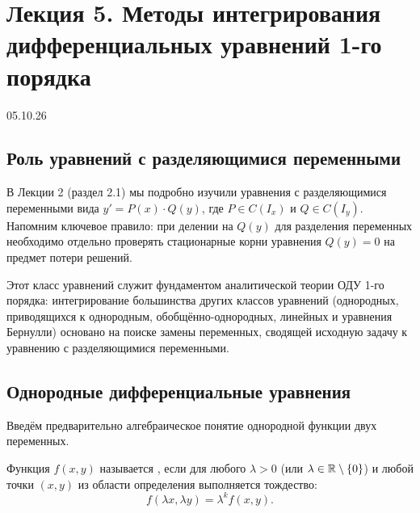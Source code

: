 \section{Лекция 5. Методы интегрирования дифференциальных уравнений 1-го порядка}

\begin{flushright}
    05.10.26
\end{flushright}

\subsection{Роль уравнений с разделяющимися переменными}

В Лекции 2 (раздел 2.1) мы подробно изучили уравнения с разделяющимися
переменными вида $y' = P(x) \cdot Q(y)$, где $P \in C(I_x)$ и $Q \in C(I_y)$.
Напомним ключевое правило: при делении на $Q(y)$ для разделения переменных
необходимо отдельно проверять стационарные корни уравнения $Q(y) = 0$ на
предмет потери решений.

Этот класс уравнений служит фундаментом аналитической теории ОДУ 1-го порядка:
интегрирование большинства других классов уравнений (однородных, приводящихся
к однородным, обобщённо-однородных, линейных и уравнения Бернулли) основано на
поиске замены переменных, сводящей исходную задачу к уравнению с
разделяющимися переменными.

\subsection{Однородные дифференциальные уравнения}

Введём предварительно алгебраическое понятие однородной функции двух
переменных.

\begin{definition}
    Функция $f(x, y)$ называется , если для любого $\lambda > 0$ (или
    $\lambda \in \mathbb{R} \setminus \{0\}$) и любой точки $(x, y)$ из области
    определения выполняется тождество:
    \begin{equation} \label{eq:l5_hom_def}
        f(\lambda x, \lambda y) = \lambda^k f(x, y). \tag{1}
    \end{equation}
\end{definition}

